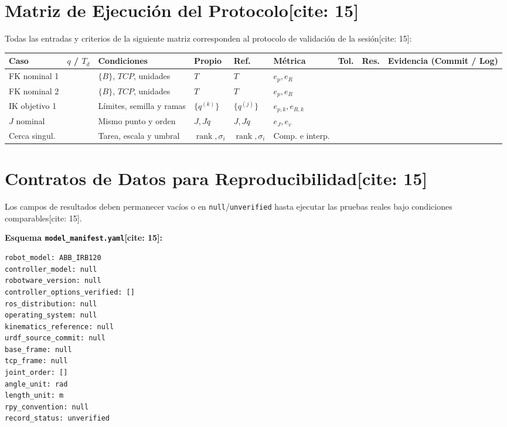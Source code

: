 \documentclass[11pt, a4paper]{article}
\begin{document}
\section{Matriz de Ejecución del Protocolo[cite: 15]}
Todas las entradas y criterios de la siguiente matriz corresponden al protocolo de validación de la sesión[cite: 15]:

\begin{center}
\scriptsize
\setlength{\tabcolsep}{3.5pt}
\renewcommand{\arraystretch}{1.45}
\begin{tabularx}{\textwidth}{|>{\hsize=0.85\hsize\raggedright\arraybackslash}X|>{\hsize=0.65\hsize\raggedright\arraybackslash}X|>{\hsize=1.25\hsize\raggedright\arraybackslash}X|>{\hsize=0.85\hsize\centering\arraybackslash}X|>{\hsize=0.85\hsize\centering\arraybackslash}X|>{\hsize=0.85\hsize\centering\arraybackslash}X|>{\hsize=0.65\hsize\centering\arraybackslash}X|>{\hsize=0.65\hsize\centering\arraybackslash}X|>{\hsize=1.40\hsize\raggedright\arraybackslash}X|}
\hline
\rowcolor{gray!20}
\textbf{Caso} & $q$ / $T_d$ & \textbf{Condiciones} & \textbf{Propio} & \textbf{Ref.} & \textbf{Métrica} & \textbf{Tol.} & \textbf{Res.} & \textbf{Evidencia (Commit / Log)} \\ \hline
FK nominal 1 & & $\{B\}$, $TCP$, unidades & $T$ & $T$ & $e_p, e_R$ & & &[cite: 15] \\ \hline
FK nominal 2 & & $\{B\}$, $TCP$, unidades & $T$ & $T$ & $e_p, e_R$ & & &[cite: 15] \\ \hline
IK objetivo 1 & & Límites, semilla y ramas & $\{q^{(k)}\}$ & $\{q^{(j)}\}$ & $e_{p,k}, e_{R,k}$ & & &[cite: 15] \\ \hline
$J$ nominal & & Mismo punto y orden & $J, J\dot{q}$ & $J, J\dot{q}$ & $e_J, e_v$ & & &[cite: 15] \\ \hline
Cerca singul. & & Tarea, escala y umbral & $\operatorname{rank}, \sigma_i$ & $\operatorname{rank}, \sigma_i$ & Comp. e interp. & & &[cite: 15] \\ \hline
\end{tabularx}
\end{center}

\section{Contratos de Datos para Reproducibilidad[cite: 15]}
Los campos de resultados deben permanecer vacíos o en \texttt{null}/\texttt{unverified} hasta ejecutar las pruebas reales bajo condiciones comparables[cite: 15].

\noindent\textbf{Esquema \texttt{model\_manifest.yaml}[cite: 15]:}
\begin{lstlisting}
robot_model: ABB_IRB120
controller_model: null
robotware_version: null
controller_options_verified: []
ros_distribution: null
operating_system: null
kinematics_reference: null
urdf_source_commit: null
base_frame: null
tcp_frame: null
joint_order: []
angle_unit: rad
length_unit: m
rpy_convention: null
record_status: unverified
\end{lstlisting}
\end{document}
